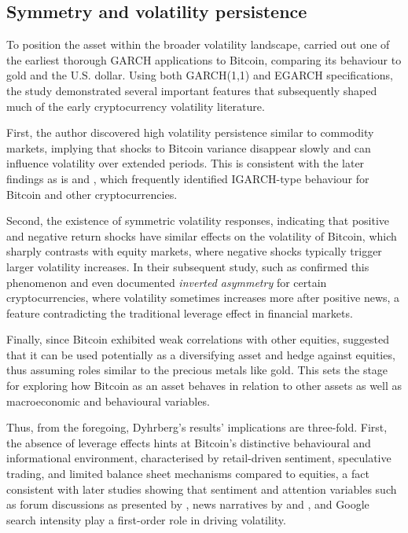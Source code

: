 \documentclass[12pt]{report}
\begin{document}
\subsection{Symmetry and volatility persistence}
To position the asset within the broader volatility landscape, \cite{dyhrberg2016bitcoin} carried out one of the earliest thorough GARCH applications to Bitcoin, comparing its behaviour to gold and the U.S. dollar. Using both GARCH(1,1) and EGARCH specifications, the study demonstrated several important features that subsequently shaped much of the early cryptocurrency volatility literature.

First, the author discovered high volatility persistence similar to commodity markets, implying that  shocks to Bitcoin variance disappear slowly and can influence volatility over extended periods. This is consistent with the later findings as is \cite{chu2017garchcrypto} and \cite{katsiampa2017volatility}, which frequently identified IGARCH-type behaviour for Bitcoin and other cryptocurrencies.

Second, the existence of symmetric volatility responses, indicating that positive and negative return shocks have similar effects on the volatility of Bitcoin, which sharply contrasts with equity markets, where negative shocks typically trigger larger volatility increases. In their subsequent study, such as \cite{bencheikh2020stgarch} confirmed this phenomenon and even documented \textit{inverted asymmetry} for certain cryptocurrencies, where volatility sometimes increases more after positive news, a feature contradicting the traditional leverage effect in financial markets.

Finally, since Bitcoin exhibited weak correlations with other equities, \cite{dyhrberg2016bitcoin} suggested that it can be used potentially as a diversifying asset and hedge against equities, thus assuming roles similar to the precious metals like gold. This sets the stage for exploring how Bitcoin as an asset behaves in relation to other assets as well as macroeconomic and behavioural variables.

Thus, from the foregoing, Dyhrberg's results' implications are three-fold. First, the absence of leverage effects hints at Bitcoin's distinctive behavioural and informational environment, characterised by retail-driven sentiment, speculative trading, and limited balance sheet mechanisms compared to equities, a fact consistent with later studies showing that sentiment and attention variables such as forum discussions as presented by
\cite{mai2018silentmajority}, news narratives by \cite{sapkota2022newsbitcoin} and \cite{coulter2022media}, and Google search intensity play a first-order role in driving volatility.
\end{document}
